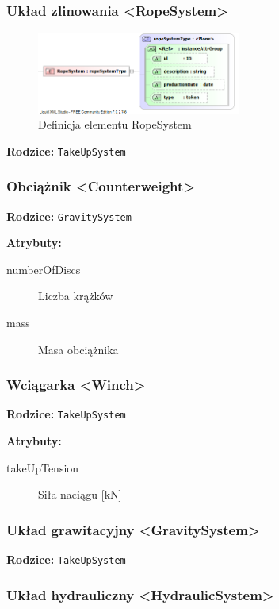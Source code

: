 \documentclass[12pt,a4paper]{article}
\begin{document}
\subsubsection{Układ zlinowania <RopeSystem>}

\begin{figure}[H]
  \centering
  \includegraphics[width=0.6\textwidth]{png/liquid/RopeSystem}
  \caption{Definicja elementu RopeSystem}
  \label{fig:ropeSystem-xsd}
\end{figure}

\noindent\textbf{Rodzice:} \texttt{TakeUpSystem}


\subsubsection{Obciążnik <Counterweight>}

\noindent\textbf{Rodzice:} \texttt{GravitySystem}

\noindent\textbf{Atrybuty:}
\begin{description}
\item[numberOfDiscs] Liczba krążków
\item[mass] Masa obciążnika
\end{description}


\subsubsection{Wciągarka <Winch>}

\noindent\textbf{Rodzice:} \texttt{TakeUpSystem}

\noindent\textbf{Atrybuty:}
\begin{description}
\item[takeUpTension] Siła naciągu [kN]
\end{description}


\subsubsection{Układ grawitacyjny <GravitySystem>}

\noindent\textbf{Rodzice:} \texttt{TakeUpSystem}


\subsubsection{Układ hydrauliczny <HydraulicSystem>}
\end{document}

